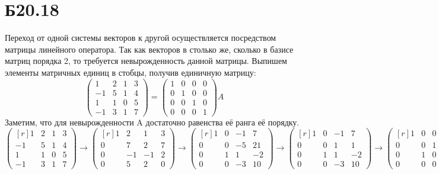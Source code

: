 \section*{Б20.18}
Переход от одной системы векторов к другой осуществляется посредством матрицы линейного оператора. Так как векторов в столько же, сколько в базисе матриц порядка 2, то требуется невырожденность данной матрицы.
Выпишем элементы матричных единиц в стобцы, получив единичную матрицу:
$$\begin{pmatrix*}
    1&2&1&3\\
    -1&5&1&4\\
    1&1&0&5\\
    -1&3&1&7
\end{pmatrix*}=
\begin{pmatrix*}
    1&0&0&0\\
    0&1&0&0\\
    0&0&1&0\\
    0&0&0&1
\end{pmatrix*}A$$
Заметим, что для невырожденности A достаточно равенства её ранга её порядку.
$$\begin{pmatrix*}[r]
    1&2&1&3\\
    -1&5&1&4\\
    1&1&0&5\\
    -1&3&1&7
\end{pmatrix*}\rightarrow
\begin{pmatrix*}[r]
    1&2&1&3\\
    0&7&2&7\\
    0&-1&-1&2\\
    0&5&2&0
\end{pmatrix*}\rightarrow
\begin{pmatrix*}[r]
    1&0&-1&7\\
    0&0&-5&21\\
    0&1&1&-2\\
    0&0&-3&10
\end{pmatrix*}
\rightarrow
\begin{pmatrix*}[r]
    1&0&-1&7\\
    0&0&1&1\\
    0&1&1&-2\\
    0&0&-3&10
\end{pmatrix*}
\rightarrow
\begin{pmatrix*}[r]
    1&0&0&8\\
    0&0&1&1\\
    0&1&0&-3\\
    0&0&0&13
\end{pmatrix*}$$
